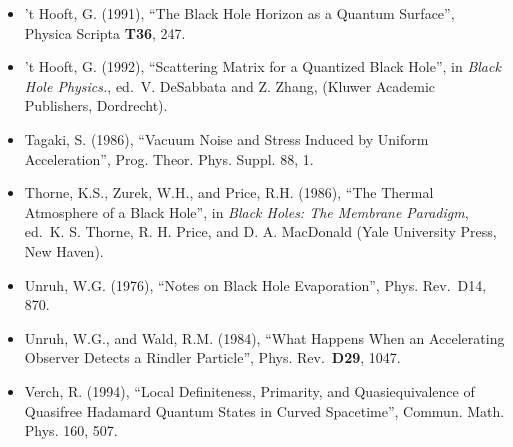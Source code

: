 \documentclass[11pt,a4paper]{article}
\begin{document}
\begin{itemize}
\item
  't Hooft, G. (1991), ``The Black Hole Horizon as a Quantum Surface'', Physica Scripta \textbf{T36}, 247.
\item
  't Hooft, G. (1992), ``Scattering Matrix for a Quantized Black Hole'', in \emph{Black Hole Physics.}, ed.~V. DeSabbata and Z. Zhang, (Kluwer Academic Publishers, Dordrecht).
\item
  Tagaki, S. (1986), ``Vacuum Noise and Stress Induced by Uniform Acceleration'', Prog. Theor. Phys. Suppl. 88, 1.
\item
  Thorne, K.S., Zurek, W.H., and Price, R.H. (1986), ``The Thermal Atmosphere of a Black Hole'', in \emph{Black Holes: The Membrane Paradigm}, ed.~K. S. Thorne, R. H. Price, and D. A. MacDonald (Yale University Press, New Haven).
\item
  Unruh, W.G. (1976), ``Notes on Black Hole Evaporation'', Phys. Rev.~D14, 870.
\item
  Unruh, W.G., and Wald, R.M. (1984), ``What Happens When an Accelerating Observer Detects a Rindler Particle'', Phys. Rev.~\textbf{D29}, 1047.
\item
  Verch, R. (1994), ``Local Definiteness, Primarity, and Quasiequivalence of Quasifree Hadamard Quantum States in Curved Spacetime'', Commun. Math. Phys. 160, 507.
\end{itemize}

\hypertarget{source-212}{}
\end{document}
